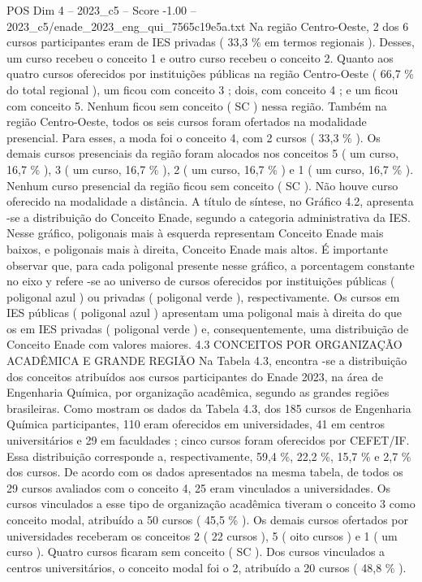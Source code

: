 \begin{textsample}{POS Dim 4 – 2023\_c5 – Score -1.00 – 2023\_c5/enade\_2023\_eng\_qui\_7565c19e5a.txt}
Na região Centro-Oeste, 2 dos 6 cursos participantes eram de IES privadas ( 33,3 \% em termos regionais ).
Desses, um curso recebeu o conceito 1 e outro curso recebeu o conceito 2.
Quanto aos quatro cursos oferecidos por instituições públicas na região Centro-Oeste ( 66,7 \% do total regional ), um ficou com conceito 3 ; dois, com conceito 4 ; e um ficou com conceito 5.
Nenhum ficou sem conceito ( SC ) nessa região.
Também na região Centro-Oeste, todos os seis cursos foram ofertados na modalidade presencial.
Para esses, a moda foi o conceito 4, com 2 cursos ( 33,3 \% ).
Os demais cursos presenciais da região foram alocados nos conceitos 5 ( um curso, 16,7 \% ), 3 ( um curso, 16,7 \% ), 2 ( um curso, 16,7 \% ) e 1 ( um curso, 16,7 \% ).
Nenhum curso presencial da região ficou sem conceito ( SC ).
Não houve curso oferecido na modalidade a distância.
A título de síntese, no Gráfico 4.2, apresenta -se a distribuição do Conceito Enade, segundo a categoria administrativa da IES.
Nesse gráfico, poligonais mais à esquerda representam Conceito Enade mais baixos, e poligonais mais à direita, Conceito Enade mais altos.
É importante observar que, para cada poligonal presente nesse gráfico, a porcentagem constante no eixo y refere -se ao universo de cursos oferecidos por instituições públicas ( poligonal azul ) ou privadas ( poligonal verde ), respectivamente.
Os cursos em IES públicas ( poligonal azul ) apresentam uma poligonal mais à direita do que os em IES privadas ( poligonal verde ) e, consequentemente, uma distribuição de Conceito Enade com valores maiores. 4.3 CONCEITOS POR ORGANIZAÇÃO ACADÊMICA E GRANDE REGIÃO Na Tabela 4.3, encontra -se a distribuição dos conceitos atribuídos aos cursos participantes do Enade 2023, na área de Engenharia Química, por organização acadêmica, segundo as grandes regiões brasileiras.
Como mostram os dados da Tabela 4.3, dos 185 cursos de Engenharia Química participantes, 110 eram oferecidos em universidades, 41 em centros universitários e 29 em faculdades ; cinco cursos foram oferecidos por CEFET/IF.
Essa distribuição corresponde a, respectivamente, 59,4 \%, 22,2 \%, 15,7 \% e 2,7 \% dos cursos.
De acordo com os dados apresentados na mesma tabela, de todos os 29 cursos avaliados com o conceito 4, 25 eram vinculados a universidades.
Os cursos vinculados a esse tipo de organização acadêmica tiveram o conceito 3 como conceito modal, atribuído a 50 cursos ( 45,5 \% ).
Os demais cursos ofertados por universidades receberam os conceitos 2 ( 22 cursos ), 5 ( oito cursos ) e 1 ( um curso ).
Quatro cursos ficaram sem conceito ( SC ).
Dos cursos vinculados a centros universitários, o conceito modal foi o 2, atribuído a 20 cursos ( 48,8 \% ).

\end{textsample}
